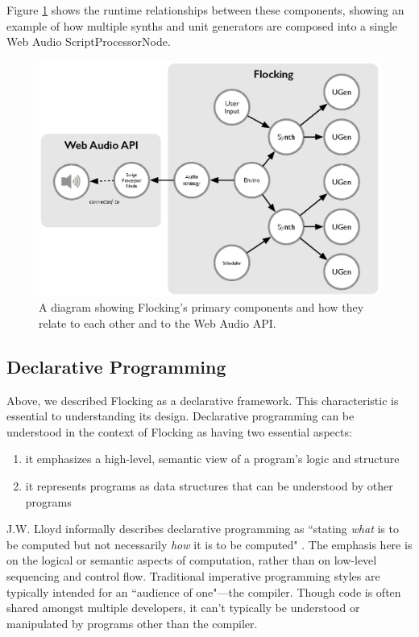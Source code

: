 \documentclass{article}
\begin{document}
Figure \ref{fig:architecture} shows the runtime relationships between these components, showing an example of how multiple synths and unit generators are composed into a single Web Audio ScriptProcessorNode.

\begin{figure}[h]
\centering
\includegraphics[width=0.9\columnwidth]{images/flocking-component-architecture.eps}
\caption{ A diagram showing Flocking's primary components and how they relate to each other and to the Web Audio API.\label{fig:architecture}}
\end{figure}

\subsection{Declarative Programming}

Above, we described Flocking as a declarative framework. This characteristic is essential to understanding its design. Declarative programming can be understood in the context of Flocking as having two essential aspects:

\begin{enumerate}
\item it emphasizes a high-level, semantic view of a program's logic and structure
\item it represents programs as data structures that can be understood by other programs
\end{enumerate}

J.W. Lloyd informally describes declarative programming as ``stating {\it what} is to be computed but not necessarily {\it how} it is to be computed" \cite{lloyd1994practical}. The emphasis here is on the logical or semantic aspects of computation, rather than on low-level sequencing and control flow. Traditional imperative programming styles are typically intended for an ``audience of one"---the compiler. Though code is often shared amongst multiple developers, it can't typically be understood or manipulated by programs other than the compiler.
\end{document}
